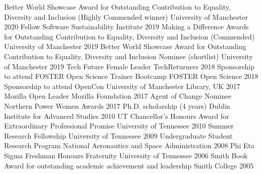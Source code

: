 \begin{cvpress}
 \cvpres
    {Better World Showcase Award for Outstanding Contribution to Equality, Diversity and Inclusion (Highly Commended winner)}
    {University of Manchester}
    {2020}
 \cvpres
    {Fellow}
    {Software Sustainability Institute}
    {2019}
 \cvpres
    {Making a Difference Awards for Outstanding Contribution to Equality, Diversity and Inclusion (Commended)}
    {University of Manchester}
    {2019}
 \cvpres
    {Better World Showcase Award for Outstanding Contribution to Equality, Diversity and Inclusion Nominee (shortlist)}
    {University of Manchester}
    {2019}
 \cvpres
    {Tech Future Female Leader}
    {TechReturners}
    {2018}
 \cvpres
    {Sponsorship to attend FOSTER Open Science Trainer Bootcamp}
    {FOSTER Open Science}
    {2018}
 \cvpres
    {Sponsorship to attend OpenCon}
    {University of Manchester Library, UK}
    {2017}
 \cvpres
    {Mozilla Open Leader}
    {Mozilla Foundation}
    {2017}
  \cvpres
    {Agent of Change Nominee}
    {Northern Power Women Awards}
    {2017}  
    \cvpres
    {Ph.D. scholarship (4 years)}
    {Dublin Institute for Advanced Studies}
    {2010}
  \cvpres
    {UT Chancellor's Honours Award for Extraordinary Professional Promise}
    {University of Tennessee}
    {2010}
  \cvpres
    {Summer Research Fellowship}
    {University of Tennessee}
    {2009}
  \cvpres
    {Undergraduate Student Research Program}
    {National Aeronautics and Space Administration}
    {2008}
  \cvpres
    {Phi Eta Sigma Freshman Honours Fraternity}
    {University of Tennessee}
    {2006}
  \cvpres
    {Smith Book Award for outstanding academic achievement and leadership}
    {Smith College}
    {2005}
\end{cvpress}

